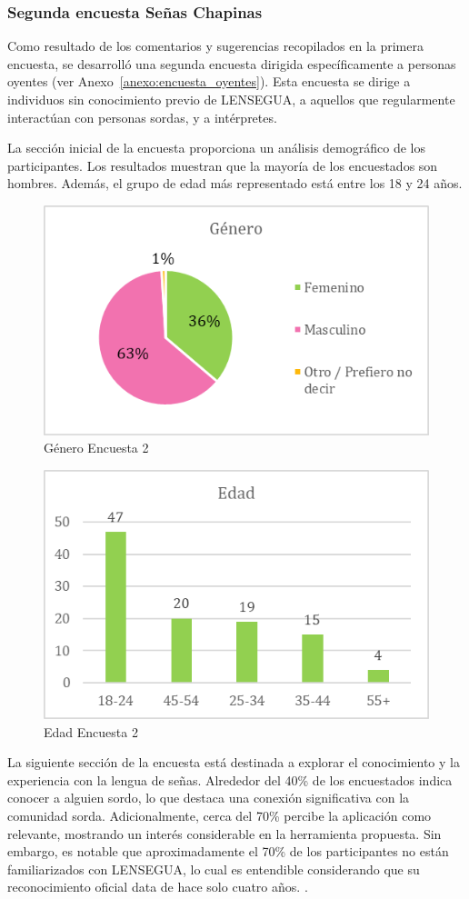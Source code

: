 \subsubsection{Segunda encuesta Señas Chapinas}

Como resultado de los comentarios y sugerencias recopilados en la primera encuesta, se desarrolló una segunda encuesta dirigida específicamente a personas oyentes (ver Anexo~\ref{anexo:encuesta_oyentes}). Esta encuesta se dirige a individuos sin conocimiento previo de LENSEGUA, a aquellos que regularmente interactúan con personas sordas, y a intérpretes. 

La sección inicial de la encuesta proporciona un análisis demográfico de los participantes. Los resultados muestran que la mayoría de los encuestados son hombres. Además, el grupo de edad más representado está entre los 18 y 24 años. 

\begin{figure} [H]
    \centering
    \includegraphics[width=0.5\linewidth]{figuras/encuesta_genero.png}
    \caption{Género Encuesta 2}
    \label{fig:enter-label}
\end{figure}

\begin{figure} [H]
    \centering
    \includegraphics[width=0.5\linewidth]{figuras/encuesta_edad.png}
    \caption{Edad Encuesta 2}
    \label{fig:enter-label}
\end{figure}

La siguiente sección de la encuesta está destinada a explorar el conocimiento y la experiencia con la lengua de señas. Alrededor del 40\% de los encuestados indica conocer a alguien sordo, lo que destaca una conexión significativa con la comunidad sorda. Adicionalmente, cerca del 70\% percibe la aplicación como relevante, mostrando un interés considerable en la herramienta propuesta. Sin embargo, es notable que aproximadamente el 70\% de los participantes no están familiarizados con LENSEGUA, lo cual es entendible considerando que su reconocimiento oficial data de hace solo cuatro años. \cite{CongresoGuatemala2020}. 

